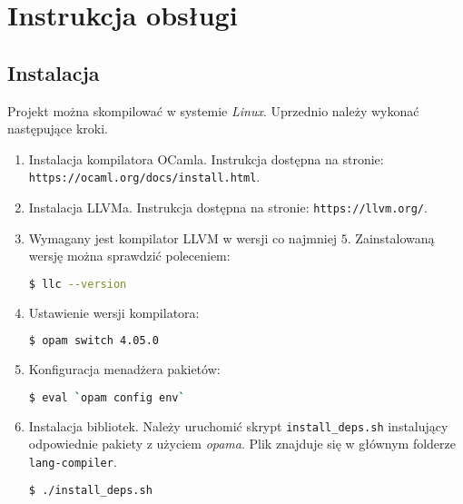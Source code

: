 \documentclass[declaration,shortabstract]{iithesis}
\begin{document}

\chapter{Instrukcja obsługi}

\section{Instalacja}

Projekt można skompilować w systemie \textit{Linux}.
Uprzednio należy wykonać następujące kroki. 

\begin{enumerate}
  \item Instalacja kompilatora OCamla. Instrukcja dostępna na stronie: \newline
  \texttt{https://ocaml.org/docs/install.html}.
  \item Instalacja LLVMa. Instrukcja dostępna na stronie: \newline
  \texttt{https://llvm.org/}.
  \item Wymagany jest kompilator LLVM w wersji co najmniej $5$. Zainstalowaną 
  wersję można sprawdzić poleceniem:
  \begin{lstlisting}[language=bash]
  $ llc --version
  \end{lstlisting}
  \item Ustawienie wersji kompilatora:
  \begin{lstlisting}[language=bash]
  $ opam switch 4.05.0
  \end{lstlisting}
  \item Konfiguracja menadżera pakietów:
  \begin{lstlisting}[language=bash]
  $ eval `opam config env`
  \end{lstlisting}
  \item Instalacja bibliotek. Należy uruchomić skrypt \texttt{install\_deps.sh}
   instalujący odpowiednie pakiety z użyciem \textit{opama}. Plik znajduje się 
   w głównym folderze 
  \texttt{lang-compiler}. 
  \begin{lstlisting}[language=bash]
  $ ./install_deps.sh
  \end{lstlisting}
\end{enumerate}

\end{document}

